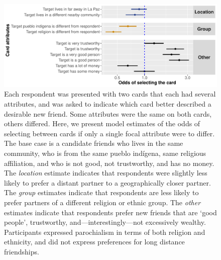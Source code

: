 \documentclass[bibauthoryear]{aa}
\begin{document}
 \begin{figure}[t]
 \centering
\includegraphics[width=5.2in]{Bolivia_CardChoice_Non-Standardized_CR} %
\caption{{\footnotesize Each respondent was presented with two cards that each had several attributes, and was asked to indicate which card better described a desirable new friend. Some attributes were the same on both cards, others differed. Here, we present model estimates of the odds of selecting between cards if only a single focal attribute were to differ. The base case is a candidate friends who lives in the same community, who is from the same pueblo ind\'igena, same religious affiliation, and who is not good, not trustworthy, and has no money. The \textit{location} estimate indicates that respondents were slightly less likely to prefer a distant partner to a geographically closer partner. The \textit{group} estimates indicate that respondents are less likely to prefer partners of a different religion or ethnic group. The \textit{other} estimates indicate that respondents prefer new friends that are `good people', trustworthy, and---interestingly---not excessively wealthy. Participants expressed parochialism in terms of both religion and ethnicity, and did not express preferences for long distance friendships. 
}
} \label{boliviacards}
\end{figure}
\end{document}
